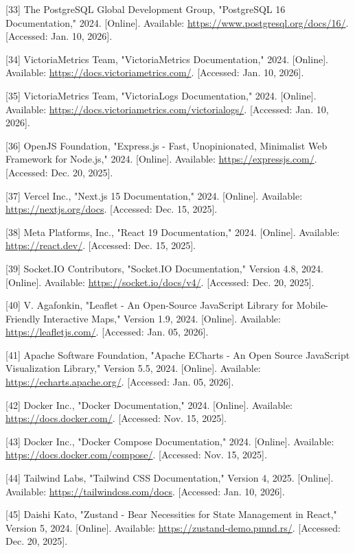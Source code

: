 \documentclass[13pt,a4paper]{extarticle}
\renewcommand{\\}{\thesislongtableorignewline\hline}%
\begin{document}
{[}33{]} The PostgreSQL Global Development Group, "PostgreSQL 16
Documentation," 2024. {[}Online{]}. Available:
\url{https://www.postgresql.org/docs/16/}. {[}Accessed: Jan. 10,
2026{]}.

{[}34{]} VictoriaMetrics Team, "VictoriaMetrics Documentation," 2024.
{[}Online{]}. Available: \url{https://docs.victoriametrics.com/}.
{[}Accessed: Jan. 10, 2026{]}.

{[}35{]} VictoriaMetrics Team, "VictoriaLogs Documentation," 2024.
{[}Online{]}. Available:
\url{https://docs.victoriametrics.com/victorialogs/}. {[}Accessed: Jan.
10, 2026{]}.

{[}36{]} OpenJS Foundation, "Express.js - Fast, Unopinionated,
Minimalist Web Framework for Node.js," 2024. {[}Online{]}. Available:
\url{https://expressjs.com/}. {[}Accessed: Dec. 20, 2025{]}.

{[}37{]} Vercel Inc., "Next.js 15 Documentation," 2024. {[}Online{]}.
Available: \url{https://nextjs.org/docs}. {[}Accessed: Dec. 15, 2025{]}.

{[}38{]} Meta Platforms, Inc., "React 19 Documentation," 2024.
{[}Online{]}. Available: \url{https://react.dev/}. {[}Accessed: Dec. 15,
2025{]}.

{[}39{]} Socket.IO Contributors, "Socket.IO Documentation," Version 4.8,
2024. {[}Online{]}. Available: \url{https://socket.io/docs/v4/}.
{[}Accessed: Dec. 20, 2025{]}.

{[}40{]} V. Agafonkin, "Leaflet - An Open-Source JavaScript Library for
Mobile-Friendly Interactive Maps," Version 1.9, 2024. {[}Online{]}.
Available: \url{https://leafletjs.com/}. {[}Accessed: Jan. 05, 2026{]}.

{[}41{]} Apache Software Foundation, "Apache ECharts - An Open Source
JavaScript Visualization Library," Version 5.5, 2024. {[}Online{]}.
Available: \url{https://echarts.apache.org/}. {[}Accessed: Jan. 05,
2026{]}.

{[}42{]} Docker Inc., "Docker Documentation," 2024. {[}Online{]}.
Available: \url{https://docs.docker.com/}. {[}Accessed: Nov. 15,
2025{]}.

{[}43{]} Docker Inc., "Docker Compose Documentation," 2024.
{[}Online{]}. Available: \url{https://docs.docker.com/compose/}.
{[}Accessed: Nov. 15, 2025{]}.

{[}44{]} Tailwind Labs, "Tailwind CSS Documentation," Version 4, 2025.
{[}Online{]}. Available: \url{https://tailwindcss.com/docs}.
{[}Accessed: Jan. 10, 2026{]}.

{[}45{]} Daishi Kato, "Zustand - Bear Necessities for State Management
in React," Version 5, 2024. {[}Online{]}. Available:
\url{https://zustand-demo.pmnd.rs/}. {[}Accessed: Dec. 20, 2025{]}.
\end{document}
